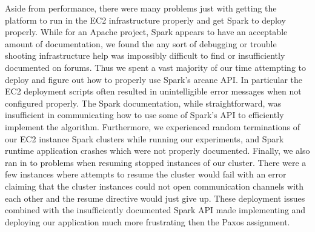 \documentclass{article}
\begin{document}
Aside from performance, there were many problems just with getting the platform to run in the EC2 infrastructure properly and get Spark to deploy properly.
While for an Apache project, Spark appears to have an acceptable amount of documentation, we found the any sort of debugging or trouble shooting infrastructure help was impossibly difficult to find or insufficiently documented on forums.
Thus we spent a vast majority of our time attempting to deploy and figure out how to properly use Spark's arcane API.
In particular the EC2 deployment scripts often resulted in unintelligible error messages when not configured properly.
The Spark documentation, while straightforward, was insufficient in communicating how to use some of Spark's API to efficiently implement the algorithm.
Furthermore, we experienced random terminations of our EC2 instance Spark clusters while running our experiments, and Spark runtime application crashes which were not properly documented.
Finally, we also ran in to problems when resuming stopped instances of our cluster.
There were a few instances where attempts to resume the cluster would fail with an error claiming that the cluster instances could not open communication channels with each other and the resume directive would just give up.
These deployment issues combined with the insufficiently documented Spark API made implementing and deploying our application much more frustrating then the Paxos assignment.
\end{document}
